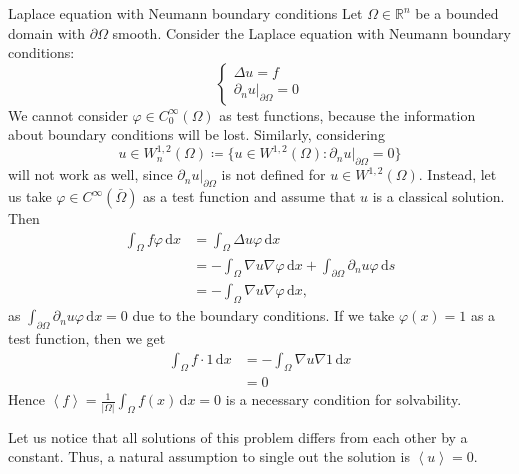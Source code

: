 \documentclass{report}
\begin{document}
\begin{example}{Laplace equation with Neumann boundary conditions}{}
    Let \(\Omega \in \mathbb{R}^{n}\) be a bounded domain with \(\partial \Omega\) smooth. Consider the Laplace equation with Neumann boundary conditions:
    \begin{equation}\label{eq:3.4}
        \begin{cases}
            \Delta u = f \\
            \left. \partial_{n} u \right|_{\partial \Omega} = 0
        \end{cases}
    \end{equation}
    We cannot consider \(\varphi \in C^{\infty}_{0}(\Omega)\) as test functions, because the information about boundary conditions will be lost. Similarly, considering
    \[
        u \in W^{1, 2}_{n}(\Omega) \coloneqq \{u \in W^{1, 2}(\Omega) \colon \left. \partial_{n} u \right|_{\partial \Omega} = 0\}
    \]
    will not work as well, since \(\left. \partial_{n} u \right|_{\partial \Omega}\) is not defined for \(u \in W^{1, 2}(\Omega)\). Instead, let us take \(\varphi \in C^{\infty}(\bar{\Omega})\) as a test function and assume that \(u\) is a classical solution. Then
    \begin{align*}
        \int_{\Omega} f \varphi \,\mathrm{d}x &= \int_{\Omega} \Delta  u \varphi \,\mathrm{d}x \\
        &= - \int_{\Omega} \nabla u \nabla \varphi \,\mathrm{d}x + \int_{\partial \Omega} \partial_{n} u \varphi \,\mathrm{d}s \\
        &= - \int_{\Omega} \nabla u \nabla \varphi \,\mathrm{d}x ,
    \end{align*}
    as \(\int_{\partial \Omega} \partial_{n} u \varphi \,\mathrm{d}x = 0\) due to the boundary conditions. If we take \(\varphi(x) = 1\) as a test function, then we get
    \begin{align*}
        \int_{\Omega} f \cdot 1 \,\mathrm{d}x &= - \int_{\Omega} \nabla u \nabla 1 \,\mathrm{d}x \\
        &= 0
    \end{align*}
    Hence \(\left\langle f \right\rangle = \frac{1}{\vert \Omega \vert }\int_{\Omega} f(x) \,\mathrm{d}x = 0\) is a necessary condition for solvability.

    Let us notice that all solutions of this problem differs from each other by a constant. Thus, a natural assumption to single out the solution is \(\left\langle u \right\rangle = 0\). 
\end{example}
\end{document}
